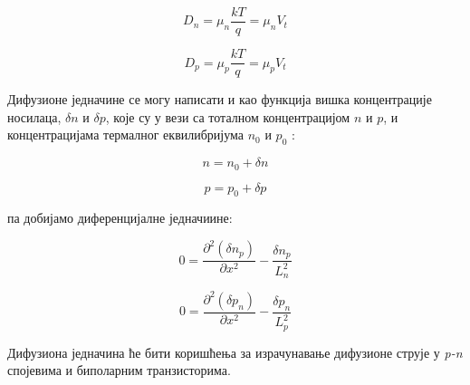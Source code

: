 \documentclass{article}
\begin{document}
\begin{equation*}
	D_n = \mu_n \dfrac{kT}{q} = \mu_n V_t
\end{equation*}

\begin{equation*}
	D_p =  \mu_p \dfrac{kT}{q} = \mu_p V_t
\end{equation*}

Дифузионе једначине се могу написати и као функција вишка концентрације носилаца, $\delta n$ и $\delta p$, које су у вези са тоталном концентрацијом $n$ и $p$, и концентрацијама термалног еквилибријума $n_0$ и $p_0$ : 

\begin{equation*}
	n = n_0 + \delta n
\end{equation*}

\begin{equation*}
	p = p_0 + \delta p
\end{equation*}

па добијамо диференцијалне једначиине:

\begin{equation*}
	0 =  \frac{\partial^2 (\delta n_p)}{\partial x^2} - \dfrac{ \delta n_p}{L_n^2}
\end{equation*}

\begin{equation*}
	0  = \frac{\partial^2 (\delta p_n)}{\partial x^2} - \dfrac{\delta p_n}{L_p^2}
\end{equation*} %

Дифузиона једначина ће бити коришћења за израчунавање дифузионе струје у \textit{p-n} спојевима и биполарним транзисторима.








\end{document}
